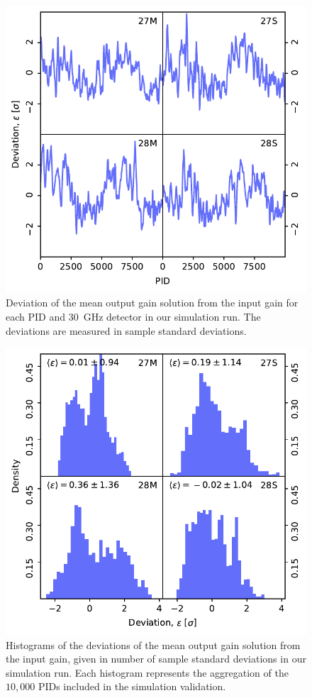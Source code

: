 \documentclass[twocolumn]{aa}
\begin{document}
\begin{figure}[t]
  \center
  \includegraphics[width=\linewidth]{figs/simdev.pdf}
    \caption{Deviation of the mean output gain solution from the input gain for
    each PID and 30\, GHz detector in our simulation run. The deviations are
    measured in sample standard deviations.}
  \label{fig:sim_dev}
\end{figure}
\begin{figure}[t]
  \center
  \includegraphics[width=\linewidth]{figs/simagghist.pdf}
    \caption{Histograms of the deviations of the mean output gain solution from
    the input gain, given in number of sample standard deviations in our
    simulation run. Each histogram represents the aggregation of the $10,000$
    PIDs included in the simulation validation.}
  \label{fig:sim_agghist}
\end{figure}
\end{document}
